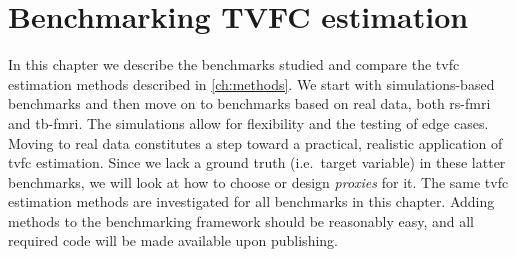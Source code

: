 \chapter{Benchmarking TVFC estimation}
\label{ch:benchmarking}

In this chapter we describe the benchmarks studied and compare the \gls{tvfc} estimation methods described in \cref{ch:methods}.
We start with simulations-based benchmarks and then move on to benchmarks based on real data, both \gls{rs-fmri} and \gls{tb-fmri}.
The simulations allow for flexibility and the testing of edge cases.
Moving to real data constitutes a step toward a practical, realistic application of \gls{tvfc} estimation.
Since we lack a ground truth (i.e.~target variable) in these latter benchmarks, we will look at how to choose or design \emph{proxies} for it.
The same \gls{tvfc} estimation methods are investigated for all benchmarks in this chapter.
Adding methods to the benchmarking framework should be reasonably easy, and all required code will be made available upon publishing.
